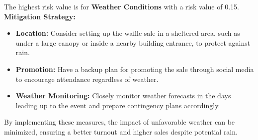\documentclass[a4paper]{scrartcl}
\begin{document}
The highest risk value is for \textbf{Weather Conditions} with a risk value of 0.15.
\textbf{Mitigation Strategy:}
\begin{itemize}
    \item \textbf{Location:} Consider setting up the waffle sale in a sheltered area, such as under a large canopy or inside a nearby building entrance, to protect against rain.
    \item \textbf{Promotion:} Have a backup plan for promoting the sale through social media to encourage attendance regardless of weather.
    \item \textbf{Weather Monitoring:} Closely monitor weather forecasts in the days leading up to the event and prepare contingency plans accordingly.
\end{itemize}
By implementing these measures, the impact of unfavorable weather can be minimized, ensuring a better turnout and higher sales despite potential rain.
\end{document}
